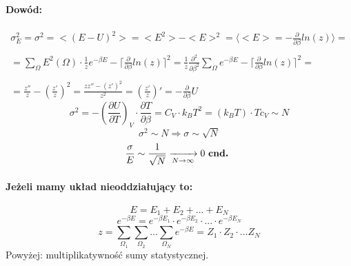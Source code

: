 \documentclass{article}
\begin{document}
		\paragraph{Dowód:}
		\begin{equation}
		\begin{array}{cc}
		\sigma^2_E = \sigma^2 = <(E-U)^2> = <E^2> - <E>^2 = \langle <E> = -\frac{\partial}{\partial \beta} ln(z) \rangle = \\ \\
		= \sum_{\Omega}^{}E^2(\Omega) \cdot \frac{1}{z}e^{-\beta E} - 
		\lceil \frac{\partial}{\partial \beta} ln(z)\rceil^2 = 
		\frac{1}{z} \frac{\partial ^2}{\partial \beta^2} \sum_{\Omega}^{} e^{-\beta E} - 
		\lceil \frac{\partial}{\partial \beta}ln(z)\rceil^2 = \\ \\
		= \frac{z''}{z} - (\frac{z'}{z})^2 = \frac{zz'' - (z')^2}{z^2} = (\frac{z'}{z})' = 
		-\frac{\partial}{\partial \beta}U
		\end{array}
		\end{equation}
		\begin{equation}
		\sigma ^2 = - (\frac{\partial U}{\partial T})_V \cdot \frac{\partial T}{\partial \beta} = C_V \cdot k_BT^2 = 
		(k_BT) \cdot Tc_V \sim N
		\end{equation}
		\begin{equation}
		\sigma^2 \sim N \Rightarrow \sigma \sim \sqrt{N}
		\end{equation}
		\begin{equation}
		\frac{\sigma}{E} \sim \frac{1}{\sqrt{N}} \xrightarrow[N \rightarrow \infty]{} 0 \text{ \textbf{cnd.} }
		\end{equation}
		\paragraph{Jeżeli mamy układ nieoddziałujący to:}
		\begin{equation}
		E = E_1 + E_2 + ... + E_N
		\end{equation}
		\begin{equation}
		e^{-\beta E} = e^{-\beta E_1} \cdot e^{-\beta E_2} \cdot ... \cdot e^{-\beta E_N}
		\end{equation}
		\begin{equation}
		z = \sum_{\Omega_1}^{}\sum_{\Omega_2}^{}...\sum_{\Omega_N}^{}e^{-\beta E} = 
		Z_1\cdot Z_2 \cdot ... Z_N
		\end{equation}
		Powyżej: multiplikatywność sumy statystycznej.
\end{document}
